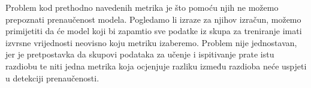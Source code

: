 Problem kod prethodno navedenih metrika je što pomoću njih ne možemo prepoznati prenaučenost modela. Pogledamo li izraze za njihov izračun, možemo primijetiti da će model koji bi zapamtio sve podatke iz skupa za treniranje imati izvrsne vrijednosti neovisno koju metriku izaberemo. Problem nije jednostavan, jer je pretpostavka da skupovi podataka za učenje i ispitivanje prate istu razdiobu te niti jedna metrika koja ocjenjuje razliku između razdioba neće uspjeti u detekciji prenaučenosti.
   